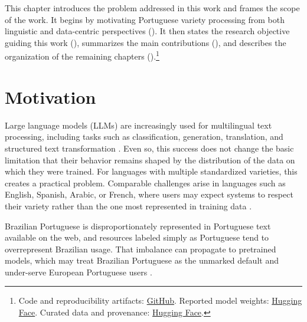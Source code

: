 \label{chap:intro}

This chapter introduces the problem addressed in this work and frames
the scope of the work. It begins by motivating Portuguese variety processing
from both linguistic and data-centric perspectives
(). It then states the research objective guiding
this work (), summarizes the main
contributions (), and describes the
organization of the remaining chapters
().\footnote{Code and reproducibility
artifacts: \href{https://github.com/laiarodrigo/Thesis}{GitHub}. Reported model
weights:
\href{https://huggingface.co/laiarodrigo/portuguese-variant-t5gemma2}{Hugging Face}.
Curated data and provenance:
\href{https://huggingface.co/datasets/laiarodrigo/portuguese-variant-data}{Hugging Face}.}

\section{Motivation}
\label{sec:intro-motivation}

Large language models (LLMs) are increasingly used for multilingual text processing,
including tasks such as classification, generation, translation, and structured
text transformation \citep{zhao2025surveylargelanguagemodels}. Even so, this
success does not change the basic limitation that their behavior remains shaped
by the distribution of the data on which they were trained. For languages with
multiple standardized varieties, this creates a practical problem.
Comparable challenges arise in languages such as English, Spanish, Arabic, or
French, where users may expect systems to respect their variety rather than the
one most represented in training data
\citep{zampieri2020natural}.

Brazilian Portuguese is disproportionately represented in Portuguese text
available on the web, and resources labeled simply as Portuguese tend to
overrepresent Brazilian usage. That imbalance can propagate to pretrained
models, which may treat Brazilian Portuguese as the unmarked default and
under-serve European Portuguese users
\citep{sousa2025enhancingportuguesevarietyidentification}.

